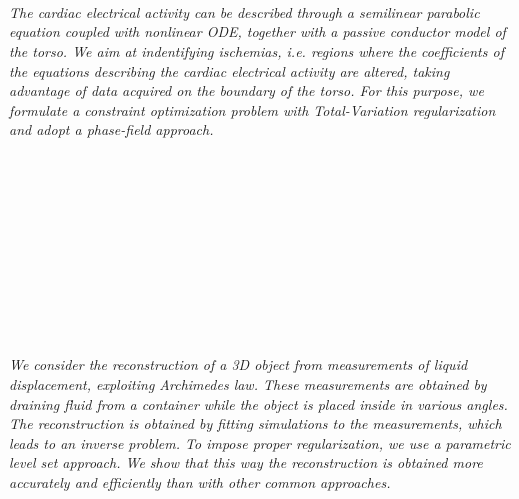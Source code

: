 \begin{multicols}{2}
\\ 
        \\
        \\\\
        \\
        \\\\
\\
      \textit{The cardiac electrical activity can be described through a semilinear parabolic equation coupled with nonlinear ODE, together with a passive conductor model of the torso.
We aim at indentifying ischemias, i.e. regions where the coefficients of the equations describing the cardiac electrical activity are altered, taking advantage of data acquired on the boundary of the torso. 
For this purpose, we formulate a constraint optimization problem with Total-Variation regularization and adopt a phase-field approach.}\\
\\ 
        \\
        \\\\
        \\
        \\\\
        \\
        \\\\
\\
      \textit{We consider the reconstruction of a 3D object from measurements of liquid displacement, exploiting Archimedes law. These measurements are obtained by draining fluid from a container while the object is placed inside in various angles. The reconstruction is obtained by fitting simulations to the measurements, which leads to an inverse problem. To impose proper regularization, we use a parametric level set approach. We show that this way the reconstruction is obtained more accurately and efficiently than with other common approaches. }\\
\\ 
        \\
        \\\\
        \\

\end{multicols}
